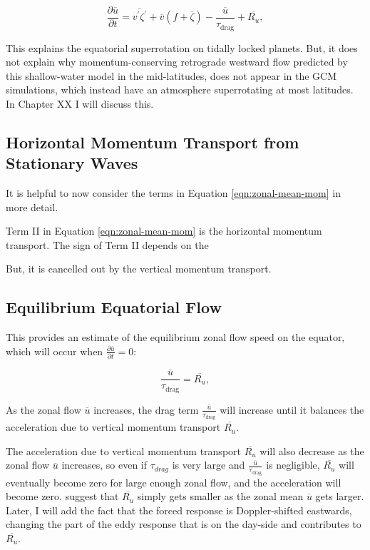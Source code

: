 \begin{equation}
  \frac { \partial \overline { u } } { \partial t } = \overline { v ^ { \prime } \zeta ^ { \prime } } + \overline { v } ( f + \overline { \zeta } ) - \frac { \overline { u } } { \tau _ { \mathrm { drag } } } + \overline { R _ { u } },
\end{equation}

This explains the equatorial superrotation on tidally locked planets. But, it does not explain why momentum-conserving retrograde westward flow predicted by this shallow-water model in the mid-latitudes, does not appear in the GCM simulations, which instead have an atmosphere superrotating at most latitudes. In Chapter XX I will discuss this.


\subsection{Horizontal Momentum Transport from Stationary Waves}

It is helpful to now consider the terms in Equation \ref{eqn:zonal-mean-mom} in more detail.

Term II in Equation \ref{eqn:zonal-mean-mom} is the horizontal momentum transport. The sign of Term II depends on the

But, it is cancelled out by the vertical momentum transport.

\subsection{Equilibrium Equatorial Flow}

This provides an estimate of the equilibrium zonal flow speed on the equator, which will occur when $\frac { \partial \overline { u } } { \partial t }=0$:

\begin{equation}
  \frac { \overline { u } } { \tau _ { \mathrm { drag } } } = \overline { R _ { u } },
\end{equation}

As the zonal flow $\overline { u }$ increases, the drag term $\frac { \overline { u } } { \tau _ { \mathrm { drag } } }$ will increase until it balances the acceleration due to vertical momentum transport $\overline { R _ { u } }$.

The acceleration due to vertical momentum transport $\overline { R _ { u } }$ will also decrease as the zonal flow $\overline { u }$ increases, so even if $\tau_{drag}$ is very large and  $\frac { \overline { u } } { \tau _ { \mathrm { drag } } }$ is negligible, $\overline { R _ { u } }$ will eventually become zero for large enough zonal flow, and the acceleration will become zero. \citet{showman2011superrotation} suggest that $\overline { R _ { u } }$ simply gets smaller as the zonal mean $\overline{u}$ gets larger. Later, I will add the fact that the forced response is Doppler-shifted eastwards, changing the part of the eddy response that is on the day-side and contributes to $\overline { R _ { u } }$.

